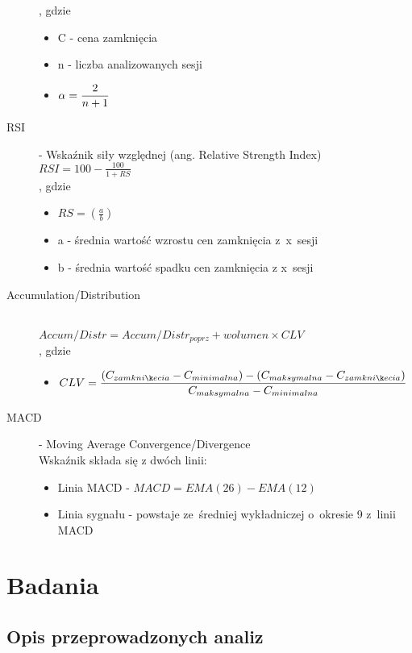 \begin{description}
		, gdzie \hfill
			\begin{itemize}
				\item C - cena zamknięcia
				\item n - liczba analizowanych sesji
				\item $\displaystyle \alpha={2\over{n+1}}$
			\end{itemize}
	\item[RSI] - Wskaźnik siły względnej (ang. Relative Strength Index) \hfill \\
		$\displaystyle RSI = 100 - \frac{100}{1+RS}$ \\
		, gdzie \hfill
			\begin{itemize}
				\item $\displaystyle RS = \left( \frac {a}{b} \right)$
				\item a - średnia wartość wzrostu cen zamknięcia z~x~sesji
				\item b - średnia wartość spadku cen zamknięcia z x~sesji
			\end{itemize}
	\item[Accumulation/Distribution] \hfill \\
		$\displaystyle Accum/Distr = Accum/Distr_{poprz} + wolumen \times CLV$ \\
		, gdzie \hfill
			\begin{itemize}
				\item $\displaystyle CLV = { (C_{zamknięcia} - C_{minimalna}) - (C_{maksymalna} - C_{zamknięcia}) \over C_{maksymalna} - C_{minimalna}}$
			\end{itemize}
	\item[MACD] - Moving Average Convergence/Divergence \hfill \\
		Wskaźnik składa się z dwóch linii:
		\begin{itemize}
			\item Linia MACD - $\displaystyle MACD = EMA(26) - EMA(12)$
			\item Linia sygnału - powstaje ze~średniej wykładniczej o~okresie 9 z~linii MACD
		\end{itemize}
\end{description}

\section{Badania}

\subsection{Opis przeprowadzonych analiz}

